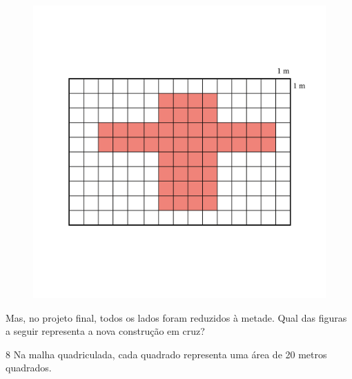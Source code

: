 \begin{figure}[htpb!]
\includegraphics[width=\textwidth]{../ilustracoes/MAT5/SAEB_5ANO_MAT_figura41.png}
\end{figure}

Mas, no projeto final, todos os lados foram reduzidos à metade. Qual das
figuras a seguir representa a nova construção em cruz?



\num{8} Na malha quadriculada, cada quadrado representa uma área de
20 metros quadrados.

